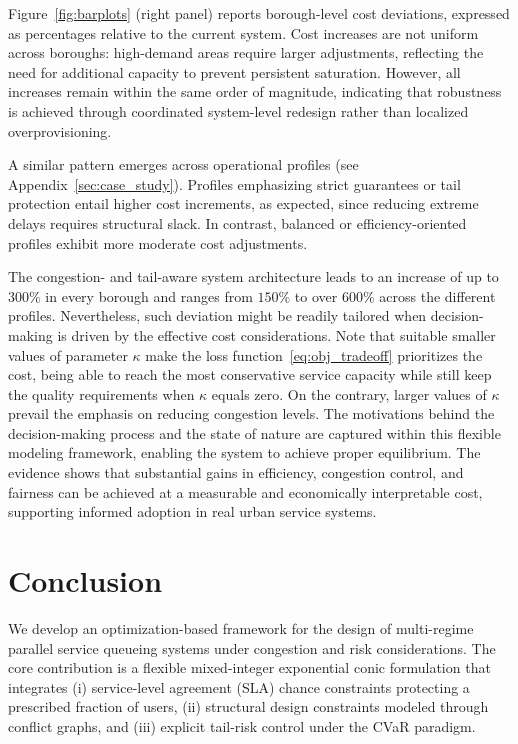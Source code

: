 \documentclass[letter,11pt, reqno]{amsart}
\begin{document}
\begin{itemize}
Figure~\ref{fig:barplots} (right panel) reports borough-level cost deviations, expressed as percentages relative to the current system. Cost increases are not uniform across boroughs: high-demand areas require larger adjustments, reflecting the need for additional capacity to prevent persistent saturation. However, all increases remain within the same order of magnitude, indicating that robustness is achieved through coordinated system-level redesign rather than localized overprovisioning.

A similar pattern emerges across operational profiles (see Appendix~\ref{sec:case_study}). Profiles emphasizing strict guarantees or tail protection entail higher cost increments, as expected, since reducing extreme delays requires structural slack. In contrast, balanced or efficiency-oriented profiles exhibit more moderate cost adjustments. 

The congestion- and tail-aware system architecture leads to an increase of up to $300\%$ in every borough and ranges from $150\%$ to over $600\%$ across the different profiles. Nevertheless, such deviation might be readily tailored when decision-making is driven by the effective cost considerations. Note that suitable smaller values of parameter $\kappa$ make the loss function~\eqref{eq:obj_tradeoff} prioritizes the cost, being able to reach the most conservative service capacity while still keep the quality requirements when $\kappa$ equals zero. On the contrary, larger values of $\kappa$ prevail the emphasis on reducing congestion levels. The motivations behind the decision-making process and the state of nature are captured within this flexible modeling framework, enabling the system to achieve proper equilibrium. The evidence shows that substantial gains in efficiency, congestion control, and fairness can be achieved at a measurable and economically interpretable cost, supporting informed adoption in real urban service systems.
\end{itemize}

\section{Conclusion}\label{sec:conclusions} 

We develop an optimization-based framework for the design of multi-regime parallel service queueing systems under congestion and risk considerations. The core contribution is a flexible mixed-integer exponential conic formulation that integrates (i) service-level agreement (SLA) chance constraints protecting a prescribed fraction of users, (ii) structural design constraints modeled through conflict graphs, and (iii) explicit tail-risk control under the CVaR paradigm. 
\end{document}
